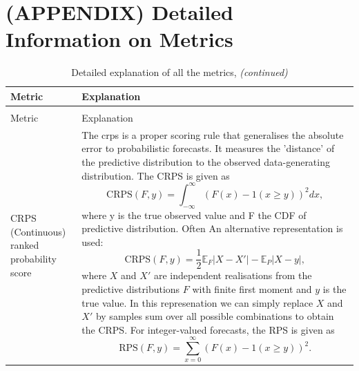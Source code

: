 \documentclass[
]{jss}
\begin{document}
\newpage

\appendix

\hypertarget{appendix-detailed-information-on-metrics}{%
\section*{(APPENDIX) Detailed Information on
Metrics}\label{appendix-detailed-information-on-metrics}}

\begin{CodeChunk}

\begin{longtable}[t]{>{\raggedright\arraybackslash}p{1.1in}>{\raggedright\arraybackslash}p{4.625in}}
\caption{\label{tab:score-table-detailed}Detailed explanation of all the metrics,}\\
\toprule
Metric & Explanation\\
\midrule
\endfirsthead
\caption[]{Detailed explanation of all the metrics, \textit{(continued)}}\\
\toprule
Metric & Explanation\\
\midrule
\endhead

\endfoot
\bottomrule
\endlastfoot
CRPS (Continuous) ranked probability score & The crps is a proper scoring rule that generalises the absolute error to probabilistic forecasts. It measures the 'distance' of the predictive distribution to the observed data-generating distribution. The CRPS is given as
  $$\text{CRPS}(F, y) = \int_{-\infty}^\infty \left( F(x) - 1(x \geq y) \right)^2 dx,$$
  where y is the true observed value and F the CDF of predictive distribution. Often An alternative representation is used:
  $$ \text{CRPS}(F, y) = \frac{1}{2} \mathbb{E}_{F} |X - X'| - \mathbb{E}_P |X - y|,$$ where $X$ and $X'$ are independent realisations from the predictive distributions $F$ with finite first moment and $y$ is the true value. In this represenation we can simply replace $X$ and $X'$ by samples sum over all possible combinations to obtain the CRPS.
  For integer-valued forecasts, the RPS is given as
  $$ \text{RPS}(F, y) = \sum_{x = 0}^\infty (F(x) - 1(x \geq y))^2. $$


\end{longtable}
\end{CodeChunk}
\end{document}
